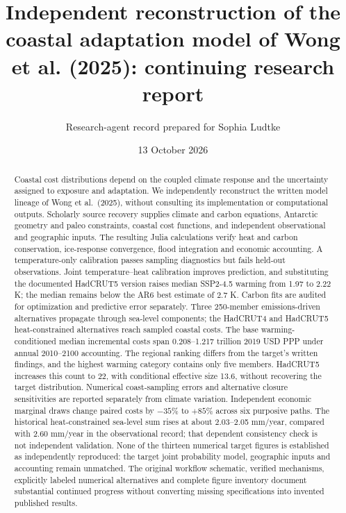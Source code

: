 \documentclass[11pt]{article}
\title{Independent reconstruction of the coastal adaptation model of Wong et al. (2025): continuing research report}
\author{Research-agent record prepared for Sophia Ludtke}
\date{13 October 2026}
\begin{document}
\maketitle
\begin{abstract}
Coastal cost distributions depend on the coupled climate response and the
uncertainty assigned to exposure and adaptation. We independently reconstruct
the written model lineage of Wong et al.\ (2025), without consulting its
implementation or computational outputs. Scholarly source recovery supplies
climate and carbon equations, Antarctic geometry and paleo constraints,
coastal cost functions, and independent observational and geographic inputs.
The resulting Julia calculations verify heat and carbon conservation,
ice-response convergence, flood integration and economic accounting.
A temperature-only calibration passes sampling diagnostics but fails held-out
observations. Joint temperature--heat calibration improves prediction, and
substituting the documented HadCRUT5 version raises median SSP2-4.5 warming
from 1.97 to 2.22 K; the median remains below the AR6 best estimate of 2.7 K.
Carbon fits are audited for optimization and predictive error separately.
Three 250-member emissions-driven alternatives propagate through sea-level
components; the HadCRUT4 and HadCRUT5 heat-constrained alternatives reach
sampled coastal costs. The base warming-conditioned median incremental costs
span 0.208--1.217 trillion
2019 USD PPP under annual 2010--2100 accounting. The regional ranking differs
from the target's written findings, and the highest warming category contains
only five members. HadCRUT5 increases this count to 22, with conditional
effective size 13.6, without recovering the target distribution. Numerical
coast-sampling errors and alternative closure
sensitivities are reported separately from climate variation. Independent
economic marginal draws change paired costs by $-35$\% to $+85$\% across six
purposive paths. The historical heat-constrained sea-level sum rises at about
2.03--2.05 mm/year, compared with 2.60 mm/year in the observational record;
that dependent consistency check is not independent validation.
None of the thirteen numerical target figures is established as independently
reproduced: the target joint probability model, geographic inputs and accounting
remain unmatched. The original workflow schematic, verified mechanisms,
explicitly labeled numerical alternatives and complete figure inventory document
substantial continued progress without converting missing specifications into
invented published results.
\end{abstract}
\end{document}
